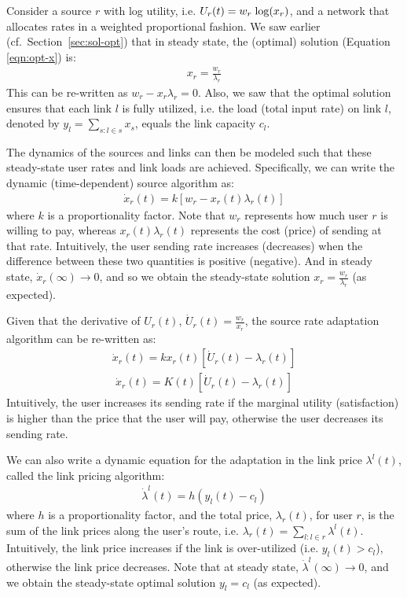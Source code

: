 \documentclass{article}
\def\lg{{\rm log}}
\begin{document}
Consider a source $r$ with log utility, i.e. $U_r(t) = w_r \; \lg(x_r)$, and 
a network that allocates rates in a weighted proportional fashion.
We saw earlier (cf.\ Section~\ref{sec:sol-opt}) that in steady state, the (optimal) solution (Equation \ref{eqn:opt-x}) is:
\begin{eqnarray}
x_r = \frac{w_r}{\lambda_r}
\label{eqn:kkt}
\end{eqnarray}
This can be re-written as $w_r - x_r \lambda_r = 0$.
Also, we saw that the optimal solution ensures that each link $l$ is fully utilized,
i.e. the load (total input rate) on link $l$, denoted by $y_l = \sum_{s: l \in s} x_s$, equals the link capacity $c_l$.

The dynamics of the sources and links can then be modeled such that these steady-state user rates and link loads are achieved. Specifically, we can write the dynamic (time-dependent) source algorithm as:
\begin{eqnarray}
\dot{x}_r (t) = k [w_r - x_r(t) \lambda_r(t)]
\label{eqn:source-adapt}
\end{eqnarray}
where $k$ is a proportionality factor.
Note that $w_r$ represents how much user $r$ is willing to pay,
whereas $x_r(t) \lambda_r(t)$ represents the cost (price) of sending at that rate.
Intuitively, the user sending rate increases (decreases) when the difference between these two quantities is positive (negative). And in steady state, $\dot{x}_r(\infty) \rightarrow 0$, and so we obtain the steady-state solution  $x_r = \frac{w_r}{\lambda_r}$ (as expected).

Given that the derivative of  $U_r(t)$, $\dot{U}_r(t) = \frac{w_r}{x_r}$, 
the source rate adaptation algorithm can be re-written as:
\begin{eqnarray*}
\dot{x}_r (t) = k x_r(t) [\dot{U}_r(t) - \lambda_r(t)]
\end{eqnarray*}
%
\begin{eqnarray}
\dot{x}_r (t) = K(t) [\dot{U}_r(t) - \lambda_r(t)]
\label{eqn:source-alg}
\end{eqnarray}
Intuitively, the user increases its sending rate if the marginal utility (satisfaction) is higher than the price that the user will pay, otherwise the user decreases its sending rate.


We can also write a dynamic equation for the adaptation in the link price $\lambda^l(t)$, called the link pricing algorithm:
\begin{eqnarray}
\dot{\lambda}^l(t) = h (y_l(t) - c_l)
\label{eqn:link-alg}
\end{eqnarray}
where $h$ is a proportionality factor, and the total price, $\lambda_r(t)$, for user $r$,
is the sum of the link prices along the user's route, i.e. $\lambda_r(t) =  \sum_{l: l \in r} \lambda^l(t)$.
Intuitively, the link price increases if the link is over-utilized (i.e. $y_l(t) > c_l$), otherwise
the link price decreases.
Note that at steady state, $\dot{\lambda}^l(\infty) \rightarrow 0$, and 
we obtain the steady-state optimal solution $y_l = c_l$ (as expected).
\end{document}
